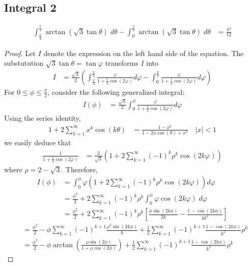 \subsection{Integral 2}
\begin{align*}
\int_{\frac{\pi}{4}}^{\frac{\pi}{2}} \arctan\left(\sqrt{3}\tan\theta\right) \; d\theta -\int_{0}^{\frac{\pi}{6}} \arctan\left(\sqrt{3}\tan\theta\right) \; d\theta &= \frac{\pi^2}{12}
\end{align*}
\begin{proof}
Let $I$ denote the expression on the left hand side of the equation. The substutution $\sqrt{3}\tan \theta = \tan \varphi$ transforms $I$ into
\begin{align*}
I &= \frac{\sqrt{3}}{2}\left( \int_{\frac{\pi}{3}}^{\frac{\pi}{2}}\frac{\varphi}{1+\frac{1}{2}\cos(2\varphi)}d\varphi -\int_{0}^{\frac{\pi}{4}}\frac{\varphi}{1+\frac{1}{2}\cos(2\varphi)}d\varphi \right)
\end{align*}
For $0\leq \phi \leq \frac{\pi}{2}$, consider the following generalized integral:
\begin{align*}
I(\phi) &= \frac{\sqrt{3}}{2}\int_{0}^{\phi}\frac{\varphi}{1+\frac{1}{2}\cos(2\varphi)}d\varphi 
\end{align*}
Using the series identity,
\begin{align*}
1+2\sum_{k=1}^\infty x^k \cos(k\theta) &= \frac{1-x^2}{1-2x\cos(\theta) + x^2} \quad |x|<1
\end{align*}
we easily deduce that
\begin{align*}
\frac{1}{1+\frac{1}{2}\cos(2\varphi)} &= \frac{2}{\sqrt{3}}\left(1+2\sum_{k=1}^\infty (-1)^k \rho^k \cos(2k\varphi) \right)
\end{align*}
where $\rho = 2-\sqrt{3}$. Therefore,
\begin{align*}
I(\phi) &= \int_0^\phi \varphi \left( 1+2\sum_{k=1}^\infty (-1)^k \rho^k \cos(2k\varphi) \right)d\varphi \\
&= \frac{\phi^2}{2} + 2\sum_{k=1}^\infty (-1)^k \rho^k \int_0^\phi \varphi \cos(2k\varphi)\; d\varphi \\
&= \frac{\phi^2}{2} + 2\sum_{k=1}^\infty (-1)^k \rho^k \left[\frac{\phi \sin(2k\phi)}{2k}-\frac{1-\cos(2k\phi)}{4k^2} \right]
\end{align*} 
\begin{align*}
&= \frac{\phi^2}{2} -\phi \sum_{k=1}^\infty (-1)^{k+1}\frac{\rho^k\sin(2k\phi)}{k}+\frac{1}{2}\sum_{k=1}^\infty (-1)^{k+1} \frac{1-\cos(2k\phi)}{k^2}\rho^k \\
&= \frac{\phi^2}{2} -\phi \arctan\left(\frac{\rho \sin(2\phi)}{1+\rho\cos(2\phi)} \right) +\frac{1}{2}\sum_{k=1}^\infty (-1)^{k+1} \frac{1-\cos(2k\phi)}{k^2}\rho^k \tag{1}

\end{align*}
\end{proof}
